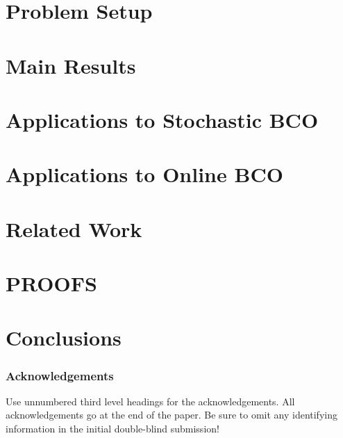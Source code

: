 \documentclass[twoside]{article}
\begin{document}
\section{Problem Setup}
\label{sec:problem}


\section{Main Results}
\label{sec:results}


\section{Applications to Stochastic BCO}
\label{sec:sbco}


\section{Applications to Online BCO}
\label{sec:obco}


\section{Related Work}
\label{sec:related}


\section{PROOFS}
\label{sec:proofs}
%

%

\section{Conclusions}
\label{sec:conc}



\clearpage\newpage


\subsubsection*{Acknowledgements}

Use unnumbered third level headings for the acknowledgements.  All
acknowledgements go at the end of the paper.  Be sure to omit any
identifying information in the initial double-blind submission!
\fi

\clearpage\newpage
\onecolumn
\appendix

\end{document}
